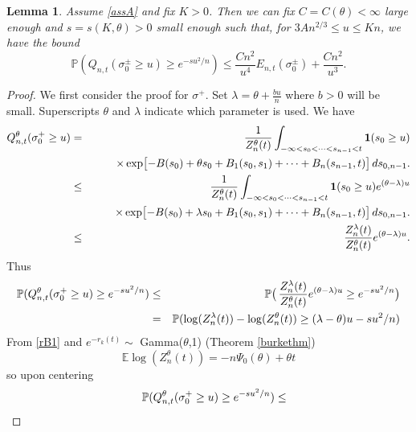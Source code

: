 \documentclass[11pt]{amsart}
\newtheorem{lemma}[theorem]{\sc Lemma}
\numberwithin{equation}{section}
\theoremstyle{remark}
\def\m1{\mathbf{1}}
\begin{document}
\begin{lemma}\label{lem_sigtail} Assume \eqref{assA} and fix $K>0$. Then
we can fix 
$C=C({\theta})<\infty$ large enough  and $s=s(K,{\theta})>0$ small enough   such that,
 for $3An^{2/3}\le u\le Kn $,  
we have the bound  
\begin{equation} {\mathbb{P}}(Q_{n,t}(\sigma_0^\pm\ge u)\ge  e^{-s u^2/n})\le \frac{C n^2}{u^4} 
E_{n,t} (\sigma_0^\pm) + \frac{C n^2}{u^3}. \label{sigtail_a}
\end{equation}
 \end{lemma}
\begin{proof}We first consider the proof for $\sigma^+$.  
Set $\lambda={\theta}+\frac{bu}{n}$ where $b>0$ will be small.
Superscripts ${\theta}$ and $\lambda$ indicate which parameter is used.  
 We have
\begin{eqnarray}
Q^{\theta}_{n,t}(\sigma_0^+\ge u)&=&\frac1{Z_{n}^{\theta}(t) } {\nonumber}
\int_{-\infty<s_{0}<\dotsm<s_{n-1}<t}  \m1(s_0\ge u)
 \\
 &&\qquad  \times  \exp\bigl[ -B(s_0)+{\theta} s_0 +  B_1(s_0,s_1) 
+\dotsm + B_n(s_{n-1},t)\bigr] \,ds_{0,n-1}.{\nonumber}\\
&\le&\frac1{Z_{n}^{\theta}(t) } {\nonumber}
\int_{-\infty<s_{0}<\dotsm<s_{n-1}<t}  \m1(s_0\ge u) e^{({\theta}-\lambda)u}
 \\
 &&\qquad  \times  \exp\bigl[ -B(s_0)+\lambda s_0 +  B_1(s_0,s_1) 
+\dotsm + B_n(s_{n-1},t)\bigr] \,ds_{0,n-1}.{\nonumber}\\
&\le& \frac{Z_n^{\lambda}(t)}{Z_{n}^{\theta}(t) }e^{({\theta}-\lambda) u}.{\nonumber}
\end{eqnarray}
Thus
\begin{eqnarray} {\nonumber}
{\mathbb{P}}(Q^{\theta}_{n,t}(\sigma_0^+\ge u)\ge e^{-su^2/n})&\le& 
{\mathbb{P}}\bigl(\,\frac{Z_n^{\lambda}(t)}{Z_{n}^{\theta}(t) }e^{({\theta}-\lambda) u}\ge e^{-su^2/n}\bigr)\\
&=&{\mathbb{P}}(\log( Z_n^{\lambda}(t))-\log( Z_n^{\theta}(t))\ge (\lambda-{\theta})u-su^2/n){\nonumber}
\end{eqnarray}
From \eqref{rB1} and $e^{-r_k(t)}\sim$ Gamma(${\theta}$,1) (Theorem \ref{burkethm}) 
\begin{equation}\label{ElogZ}
{\mathbb{E}} \log( Z_n^{\theta}(t))=-n {\Psi_0}({\theta})+{\theta} t
\end{equation}
so upon centering 
\begin{eqnarray}{\nonumber} 
&&{\mathbb{P}}(Q^{\theta}_{n,t}(\sigma_0^+\ge u)\ge e^{-su^2/n})\le \\

\end{eqnarray}
\end{proof}
\end{document}
